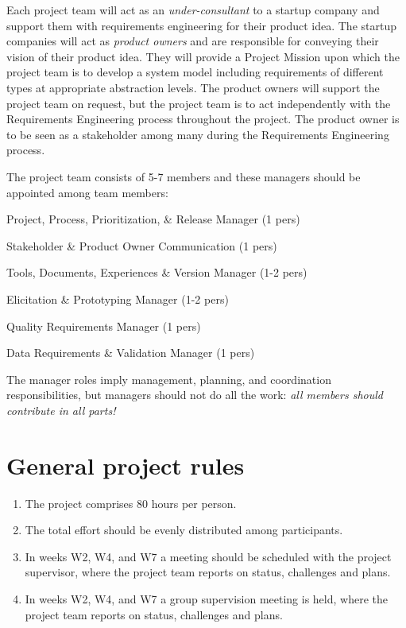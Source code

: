    \noindent Each project team will act as an \textit{under-consultant} to a startup company and support them with requirements engineering for their product idea. The startup companies will act as \textit{product owners} and are responsible for conveying their vision of their product idea. They will provide a Project Mission upon which the project team is to develop a system model including requirements of different types at appropriate abstraction levels. The product owners will support the project team on request, but the project team is to act independently with the Requirements Engineering process throughout the project. The product owner is to be seen as a stakeholder among many during the Requirements Engineering process.
   \newline

   \noindent The project team consists of 5-7 members and these managers should be appointed among team members:

   \begin{description}[noitemsep]
   \item[P3RM] Project, Process, Prioritization, \& Release Manager (1 pers)
   \item[SPOC] Stakeholder \& Product Owner Communication (1 pers)
   \item[TDEVM] Tools, Documents, Experiences \& Version Manager (1-2 pers)
   \item[EPM] Elicitation \& Prototyping Manager (1-2 pers)
   \item[QRM] Quality Requirements Manager (1 pers)
   \item[DRVM] Data Requirements \& Validation Manager (1 pers)
   \end{description}

   \noindent The manager roles imply management, planning, and coordination responsibilities, but managers should not do all the work: {\it all members should contribute in all parts!}
\fi 

\section{General project rules}
\begin{enumerate}[noitemsep]
\item The project comprises 80 hours per person.
\item The total effort should be evenly distributed among participants.
\ifteknolog
   \item In weeks W2, W4, and W7 a meeting should be scheduled with the project supervisor, where the project team reports on status, challenges and plans.
 \else
 \item In weeks W2, W4, and W7 a group supervision meeting is held, where the project team reports on status, challenges and plans.
 \fi
\end{enumerate}

